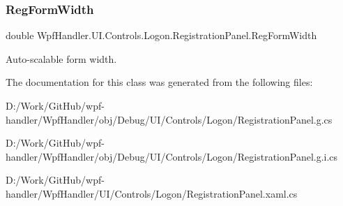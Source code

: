 \subsubsection{\texorpdfstring{Reg\+Form\+Width}{RegFormWidth}}
{\footnotesize\ttfamily double Wpf\+Handler.\+U\+I.\+Controls.\+Logon.\+Registration\+Panel.\+Reg\+Form\+Width\hspace{0.3cm}{\ttfamily [get]}}



Auto-\/scalable form width. 



The documentation for this class was generated from the following files\+:\begin{DoxyCompactItemize}
\item 
D\+:/\+Work/\+Git\+Hub/wpf-\/handler/\+Wpf\+Handler/obj/\+Debug/\+U\+I/\+Controls/\+Logon/Registration\+Panel.\+g.\+cs\item 
D\+:/\+Work/\+Git\+Hub/wpf-\/handler/\+Wpf\+Handler/obj/\+Debug/\+U\+I/\+Controls/\+Logon/Registration\+Panel.\+g.\+i.\+cs\item 
D\+:/\+Work/\+Git\+Hub/wpf-\/handler/\+Wpf\+Handler/\+U\+I/\+Controls/\+Logon/Registration\+Panel.\+xaml.\+cs\end{DoxyCompactItemize}
